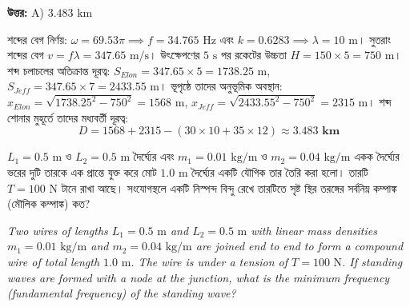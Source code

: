 \documentclass[12pt, a4paper]{article}
\begin{document}
\vspace{0.5em}
\begin{tcolorbox}[answerbox]
    \textbf{\color{success} উত্তর:} A) $3.483\text{ km}$
\end{tcolorbox}
\vspace{1em}

\begin{tcolorbox}[solutionbox={সমাধান (Solution)}]
    \noindent
    শব্দের বেগ নির্ণয়: $\omega = 69.53\pi \implies f = 34.765\text{ Hz}$ এবং $k = 0.6283 \implies \lambda = 10\text{ m}$। সুতরাং শব্দের বেগ $v = f\lambda = 347.65\text{ m/s}$। উৎক্ষেপণের $5\text{ s}$ পর রকেটের উচ্চতা $H = 150 \times 5 = 750\text{ m}$। 
    শব্দ চলাচলের অতিক্রান্ত দূরত্ব: $S_{Elon} = 347.65 \times 5 = 1738.25\text{ m}$, $S_{Jeff} = 347.65 \times 7 = 2433.55\text{ m}$।
    ভূপৃষ্ঠে তাদের অনুভূমিক অবস্থান: $x_{Elon} = \sqrt{1738.25^2 - 750^2} = 1568\text{ m}$, $x_{Jeff} = \sqrt{2433.55^2 - 750^2} = 2315\text{ m}$।
    শব্দ শোনার মুহূর্তে তাদের মধ্যবর্তী দূরত্ব:
    \[ D = 1568 + 2315 - (30 \times 10 + 35 \times 12) \approx \mathbf{3.483\text{ km}} \]
\end{tcolorbox}

\vspace{2em}

\begin{tcolorbox}[questionbox={প্রশ্ন (Question) 20}]
    \noindent
    $L_1 = 0.5\text{ m}$ ও $L_2 = 0.5\text{ m}$ দৈর্ঘ্যের এবং $m_1 = 0.01\text{ kg/m}$ ও $m_2 = 0.04\text{ kg/m}$ একক দৈর্ঘ্যের ভরের দুটি তারকে এক প্রান্তে যুক্ত করে মোট $1.0\text{ m}$ দৈর্ঘ্যের একটি যৌগিক তার তৈরি করা হলো। তারটি $T = 100\text{ N}$ টানে রাখা আছে। সংযোগস্থলে একটি নিস্পন্দ বিন্দু রেখে তারটিতে সৃষ্ট স্থির তরঙ্গের সর্বনিম্ন কম্পাঙ্ক (মৌলিক কম্পাঙ্ক) কত?
    
    \vspace{0.8em}
    \begin{english}
    \noindent\textit{\color{darkgray}
    Two wires of lengths $L_1 = 0.5\text{ m}$ and $L_2 = 0.5\text{ m}$ with linear mass densities $m_1 = 0.01\text{ kg/m}$ and $m_2 = 0.04\text{ kg/m}$ are joined end to end to form a compound wire of total length $1.0\text{ m}$. The wire is under a tension of $T = 100\text{ N}$. If standing waves are formed with a node at the junction, what is the minimum frequency (fundamental frequency) of the standing wave?
    }
    \end{english}
\end{tcolorbox}
\end{document}
